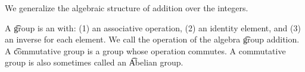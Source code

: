 

We generalize the algebraic structure of addition over the integers.


A \t{group} is an  with:
(1) an associative operation,
(2) an identity element, and
(3) an inverse for each element.
We call the operation of the algebra \t{group addition}.
A \t{commutative group} is a group whose operation commutes.
A commutative group is also sometimes called an \t{Abelian group}.

\blankpage
